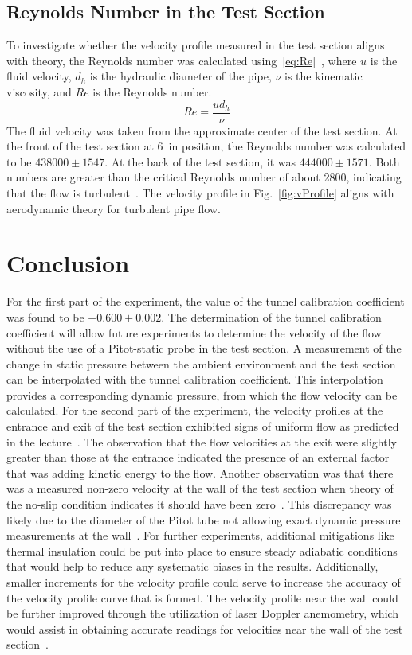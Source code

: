 \documentclass[journal,letterpaper]{IEEEtran}
\begin{document}
\subsection{Reynolds Number in the Test Section}

To investigate whether the velocity profile measured in the test section aligns with theory, the Reynolds number was calculated using~\eqref{eq:Re}~\cite{HeatTransfer}, where $u$ is the fluid velocity, $d_h$ is the hydraulic diameter of the pipe, $\nu$ is the kinematic viscosity, and $Re$ is the Reynolds number.
\begin{equation} \label{eq:Re}
    Re = \frac{ud_h}{\nu}
\end{equation}
The fluid velocity was taken from the approximate center of the test section.
At the front of the test section at \qty{6}{in} position, the Reynolds number was calculated to be $438000 \pm 1547$. At the back of the test section, it was $444000 \pm 1571$. Both numbers are greater than the critical Reynolds number of about 2800, indicating that the flow is turbulent~\cite{HeatTransfer}. The velocity profile in Fig.~\ref{fig:vProfile} aligns with aerodynamic theory for turbulent pipe flow.


\section{Conclusion}


For the first part of the experiment, the value of the tunnel calibration coefficient was found to be $-0.600 \pm 0.002$.
The determination of the tunnel calibration coefficient will allow future experiments to determine the velocity of the flow without the use of a Pitot-static probe in the test section.
A measurement of the change in static pressure between the ambient environment and the test section can be interpolated with the tunnel calibration coefficient.
This interpolation provides a corresponding dynamic pressure, from which the flow velocity can be calculated.
For the second part of the experiment, the velocity profiles at the entrance and exit of the test section exhibited signs of uniform flow as predicted in the lecture~\cite{lecture}.
The observation that the flow velocities at the exit were slightly greater than those at the entrance indicated the presence of an external factor that was adding kinetic energy to the flow.
Another observation was that there was a measured non-zero velocity at the wall of the test section when theory of the no-slip condition indicates it should have been zero~\cite{Aero}.
This discrepancy was likely due to the diameter of the Pitot tube not allowing exact dynamic pressure measurements at the wall~\cite{Aero}.
For further experiments, additional mitigations like thermal insulation could be put into place to ensure steady adiabatic conditions that would help to reduce any systematic biases in the results.
Additionally, smaller increments for the velocity profile could serve to increase the accuracy of the velocity profile curve that is formed.
The velocity profile near the wall could be further improved through the utilization of laser Doppler anemometry, which would assist in obtaining accurate readings for velocities near the wall of the test section~\cite{PitotLecture}.  
\end{document}
